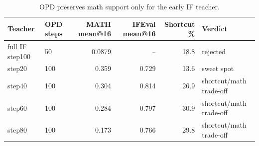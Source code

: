 \begin{table}[t]
\centering
\small
\caption{OPD preserves math support only for the early IF teacher.}
\label{tab:opd-sweetspot}
\begin{tabular}{llrrrl}
\toprule
Teacher & OPD steps & MATH mean@16 & IFEval mean@16 & Shortcut \% & Verdict \\
\midrule
full IF step100 & 50 & 0.0879 & -- & 18.8 & rejected \\
step20 & 100 & 0.359 & 0.729 & 13.6 & sweet spot \\
step40 & 100 & 0.304 & 0.814 & 26.9 & shortcut/math trade-off \\
step60 & 100 & 0.284 & 0.797 & 30.9 & shortcut/math trade-off \\
step80 & 100 & 0.173 & 0.766 & 29.8 & shortcut/math trade-off \\
\bottomrule
\end{tabular}
\end{table}
